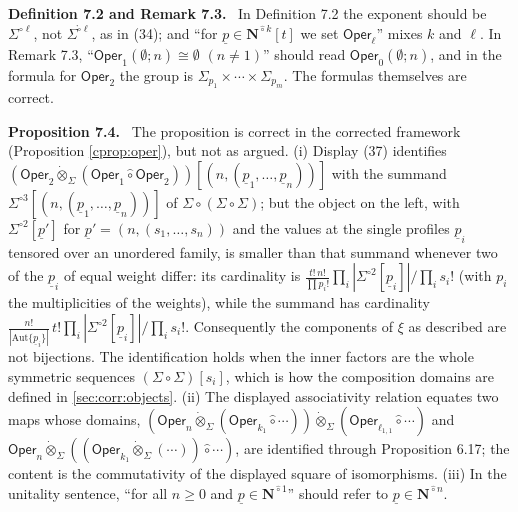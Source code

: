 \documentclass[12pt]{article}
\theoremstyle{plain}
\theoremstyle{definition}
\theoremstyle{remark}
\newcommand{\Ncirc}[1]{\mathbf{N}^{\hat{\circ}#1}}
\newcommand{\Oper}{\mathsf{Oper}}
\newcommand{\circhat}{\hat{\circ}}
\newcommand{\tensordot}{\dot{\otimes}}
\newcommand{\boxcirc}{\mathring{\square}}
\newcommand{\corr}[1]{\par\smallskip\noindent\textbf{#1.}\ }
\begin{document}
\corr{Definition 7.2 and Remark 7.3} In Definition 7.2 the exponent should be $\Sigma^{\circ\ell}$, not $\Sigma^{\boxcirc\ell}$, as in (34); and ``for $\underline p\in\Ncirc k[t]$ we set $\Oper_\ell$'' mixes $k$ and $\ell$. In Remark 7.3, ``$\Oper_1(\emptyset;n)\cong\emptyset$ $(n\neq1)$'' should read $\Oper_0(\emptyset;n)$, and in the formula for $\Oper_2$ the group is $\Sigma_{p_1}\times\cdots\times\Sigma_{p_m}$. The formulas themselves are correct.

\corr{Proposition 7.4} The proposition is correct in the corrected framework (Proposition \ref{cprop:oper}), but not as argued. (i) Display (37) identifies $(\Oper_2\tensordot_\Sigma(\Oper_1\circhat\Oper_2))[(n,(\underline p_1,\dots,\underline p_n))]$ with the summand $\Sigma^{\circ3}[(n,(\underline p_1,\dots,\underline p_n))]$ of $\Sigma\circ(\Sigma\circ\Sigma)$; but the object on the left, with $\Sigma^{\circ2}[\underline p']$ for $\underline p'=(n,(s_1,\dots,s_n))$ and the values at the single profiles $\underline p_i$ tensored over an unordered family, is smaller than that summand whenever two of the $\underline p_i$ of equal weight differ: its cardinality is $\frac{t!\,n!}{\prod p_i!}\prod_i|\Sigma^{\circ2}[\underline p_i]|/\prod_is_i!$ (with $p_i$ the multiplicities of the weights), while the summand has cardinality $\frac{n!}{|\mathrm{Aut}\{\underline p_i\}|}\,t!\prod_i|\Sigma^{\circ2}[\underline p_i]|/\prod_is_i!$. Consequently the components of $\xi$ as described are not bijections. The identification holds when the inner factors are the whole symmetric sequences $(\Sigma\circ\Sigma)[s_i]$, which is how the composition domains are defined in \ref{sec:corr:objects}. (ii) The displayed associativity relation equates two maps whose domains, $(\Oper_n\tensordot_\Sigma(\Oper_{k_1}\circhat\cdots))\tensordot_\Sigma(\Oper_{\ell_{1,1}}\circhat\cdots)$ and $\Oper_n\tensordot_\Sigma((\Oper_{k_1}\tensordot_\Sigma(\cdots))\circhat\cdots)$, are identified through Proposition 6.17; the content is the commutativity of the displayed square of isomorphisms. (iii) In the unitality sentence, ``for all $n\geq0$ and $\underline p\in\Ncirc1$'' should refer to $\underline p\in\Ncirc n$.
\end{document}

